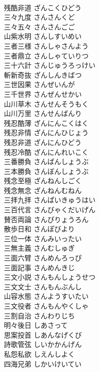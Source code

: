 \documentclass[8pt]{extreport}
\begin{document}
\begin{CJK}{UTF8}{min}
\\	残酷非道	ざんこくひどう	
\\	三々九度	さんさんくど	
\\	三々五々	さんさんごご	
\\	山紫水明	さんしすいめい	
\\	三者三様	さんしゃさんよう	
\\	三者鼎立	さんしゃていりつ	
\\	三十六計	さんじゅうろっけい	
\\	斬新奇抜	ざんしんきばつ	
\\	三世因果	さんぜいんが	
\\	三千世界	さんぜんせかい	
\\	山川草木	さんせんそうもく	
\\	山川万里	さんせんばんり	
\\	残忍酷薄	ざんにんこくはく	
\\	残忍非情	ざんにんひじょう	
\\	残忍非道	ざんにんひどう	
\\	残忍冷酷	ざんにんれいこく	
\\	三番勝負	さんばんしょうぶ	
\\	三本勝負	さんぼんしょうぶ	
\\	残念至極	ざんねんしごく	
\\	残念無念	ざんねんむねん	
\\	三拝九拝	さんぱいきゅうはい	
\\	三百代言	さんびゃくだいげん	
\\	賛否両論	さんぴりょうろん	
\\	散歩日和	さんぽびより	
\\	三位一体	さんみいったい	
\\	三無主義	さんむしゅぎ	
\\	三面六臂	さんめんろっぴ	
\\	三面記事	さんめんきじ	
\\	三文小説	さんもんしょうせつ	
\\	三文文士	さんもんぶんし	
\\	山容水態	さんようすいたい	
\\	三文役者	さんもんやくしゃ	
\\	三割自治	さんわりじち	
\\	明々後日	しあさって	
\\	思案投首	しあんなげくび	
\\	詩歌管弦	しいかかんげん	
\\	私怨私欲	しえんしよく	
\\	四海兄弟	しかいけいてい	

\end{CJK}
\end{document}

